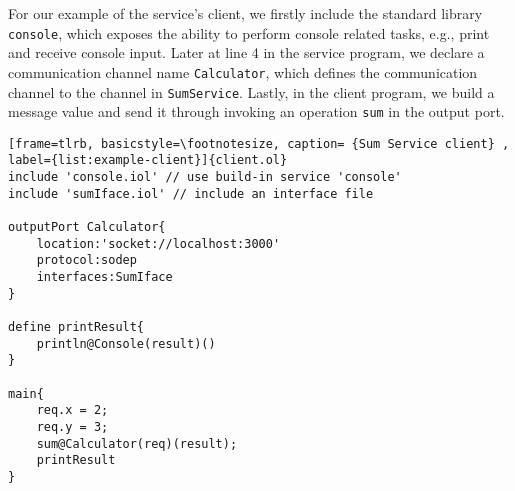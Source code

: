 For our example of the service's client, we firstly include the standard library \texttt{console}, which exposes the ability to perform console related tasks, e.g., print and receive console input. Later at line 4 in the service program, we declare a communication channel name \texttt{Calculator}, which defines the communication channel to the channel in \texttt{SumService}. Lastly, in the client program, we build a message value and send it through invoking an operation \texttt{sum} in the output port.

\begin{listing}[ht]
    \lstset{language=Jolie,
        style=codeStyle,
        numbers=left,
        firstnumber=1
    }
\begin{lstlisting}[frame=tlrb, basicstyle=\footnotesize, caption= {Sum Service client} , label={list:example-client}]{client.ol}
include 'console.iol' // use build-in service 'console'
include 'sumIface.iol' // include an interface file 

outputPort Calculator{
    location:'socket://localhost:3000'
    protocol:sodep 
    interfaces:SumIface
}

define printResult{
    println@Console(result)()
}

main{
    req.x = 2;
    req.y = 3;
    sum@Calculator(req)(result);
    printResult
}
\end{lstlisting}
\end{listing}

\FloatBarrier
